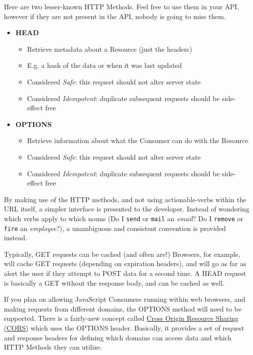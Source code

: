 Here are two lesser-known HTTP Methods. Feel free to use them in your API, however if they are not present in the API, nobody is going to miss them.

\begin{itemize}
\item \textbf{HEAD}
    \begin{itemize}
    \item Retrieve metadata about a Resource (just the headers)
    \item E.g. a hash of the data or when it was last updated
    \item Considered \emph{Safe}: this request should not alter server state
    \item Considered \emph{Idempotent}: duplicate subsequent requests should be side-effect free
    \end{itemize}
\item \textbf{OPTIONS}
    \begin{itemize}
    \item Retrieve information about what the Consumer can do with the Resource
    \item Considered \emph{Safe}: this request should not alter server state
    \item Considered \emph{Idempotent}: duplicate subsequent requests should be side-effect free
    \end{itemize}
\end{itemize}

By making use of the HTTP methods, and not using actionable-verbs within the URL itself, a simpler interface is presented to the developer. Instead of wondering which verbs apply to which nouns (Do I \texttt{send} or \texttt{mail} an \emph{email}? Do I \texttt{remove} or \texttt{fire} an \emph{employee}?), a unambiguous and consistent convention is provided instead.

Typically, GET requests can be cached (and often are!) Browsers, for example, will cache GET requests (depending on expiration headers), and will go as far as alert the user if they attempt to POST data for a second time. A HEAD request is basically a GET without the response body, and can be cached as well.

If you plan on allowing JavaScript Consumers running within web browsers, and making requests from different domains, the OPTIONS method will need to be supported. There is a fairly-new concept called \href{https://en.wikipedia.org/wiki/Cross-origin_resource_sharing}{Cross Origin Resource Sharing (CORS)} which uses the OPTIONS header. Basically, it provides a set of request and response headers for defining which domains can access data and which HTTP Methods they can utilize.


